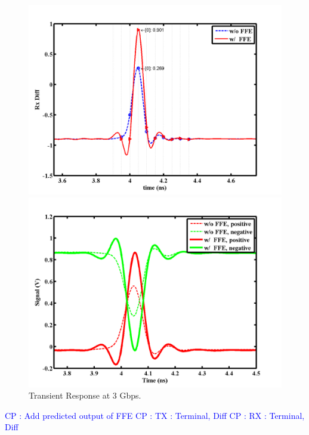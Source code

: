 \documentclass{book}  %
\newcommand{\cphighlight}[1]{\Huge\textcolor{blue}{CP : #1}\normalsize}
\begin{document}
\begin{paper}
\begin{figure}[htbp!]
	\ContinuedFloat
	\begin{minipage}[tb]{0.5\textwidth}
		\centering	
		\includegraphics[width=\textwidth]{./img/Verilog/20G/2_diff.png}
	\end{minipage}%
	\begin{minipage}[tb]{0.5\textwidth}
		\centering	
		\includegraphics[width=\textwidth]{./img/Verilog/20G/2.png}
	\end{minipage}%
	\caption{Transient Response at 3 Gbps.}
\end{figure}
\cphighlight{Add predicted output of FFE}
\cphighlight{TX : Terminal, Diff}
\cphighlight{RX : Terminal, Diff}



\end{paper}
\end{document}
